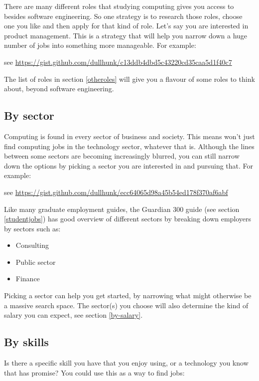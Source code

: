 \documentclass[
]{book}
\providecommand{\tightlist}{%
  \setlength{\itemsep}{0pt}\setlength{\parskip}{0pt}}
\begin{document}
There are many different roles that studying computing gives you access to besides software engineering. So one strategy is to research those roles, choose one you like and then apply for that kind of role. Let's say you are interested in product management. This is a strategy that will help you narrow down a huge number of jobs into something more manageable. For example:

see \url{https://gist.github.com/dullhunk/c13ddb4dbd5c43220cd35caa5d1f40c7}

The list of roles in section \ref{otheroles} will give you a flavour of some roles to think about, beyond software engineering.

\hypertarget{by-sector}{%
\subsection{By sector}\label{by-sector}}

Computing is found in every sector of business and society. This means won't just find computing jobs in the technology sector, whatever that is. Although the lines between some sectors are becoming increasingly blurred, you can still narrow down the options by picking a sector you are interested in and pursuing that. For example:

see \url{https://gist.github.com/dullhunk/ecc64065d98a45b54ed178f370af6abf}

Like many graduate employment guides, the Guardian 300 guide (see section \ref{studentjobs}) has good overview of different sectors by breaking down employers by sectors such as:

\begin{itemize}
\tightlist
\item
  Consulting
\item
  Public sector
\item
  Finance
\end{itemize}

Picking a sector can help you get started, by narrowing what might otherwise be a massive search space. The sector(s) you choose will also determine the kind of salary you can expect, see section \ref{by-salary}. \citep{letsmakelotsofmoney}

\hypertarget{by-skills}{%
\subsection{By skills}\label{by-skills}}

Is there a specific skill you have that you enjoy using, or a technology you know that has promise? You could use this as a way to find jobs:
\end{document}
